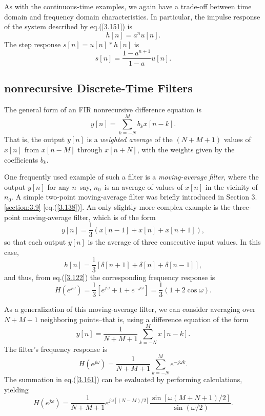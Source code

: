 \documentclass[a4paper,10pt,twoside]{book}
\begin{document}
As with the continuous-time examples, we again have a trade-off between time domain and frequency domain characteristics. In particular, the impulse response of the system described by eq.\;(\ref{3.151}) is
\begin{equation}
    h[n]=a^nu[n].
    \label{3.155}
\end{equation}
The step response $s[n]=u[n]*h[n]$ is
\begin{equation}
    s[n]=\frac{1-a^{n+1}}{1-a}u[n].
    \label{3.156}
\end{equation}

\subsection{nonrecursive Discrete-Time Filters}

The general form of an FIR nonrecursive difference equation is
\begin{equation}
    y[n]=\sum_{k=-N}^Mb_kx[n-k].
    \label{3.157}
\end{equation}
That is, the output $y[n]$ is a \textit{weighted average} of the $(N+M+1)$ values of $x[n]$ from $x[n-M]$ through $x[n+N]$, with the weights given by the coefficients $b_k$.

One frequently used example of such a filter is a \textit{moving-average filter}, where the output $y[n]$ for any $n$--say, $n_0$--is an average of values of $x[n]$ in the vicinity of $n_0$. A simple two-point moving-average filter was briefly introduced in Section 3.\ref{section:3.9} [eq.\;(\ref{3.138})]. An only slightly more complex example is the three-point moving-average filter, which is of the form
\begin{equation}
    y[n]=\frac13(x[n-1]+x[n]+x[n+1]),
    \label{3.158}
\end{equation}
so that each output $y[n]$ is the average of three consecutive input values. In this case, $$h[n]=\frac13[\delta[n+1]+\delta[n]+\delta[n-1]],$$ and thus, from eq.\;(\ref{3.122}) the corresponding frequency response is
\begin{equation}
    H(e^{j\omega})=\frac13[e^{j\omega}+1+e^{-j\omega}]=\frac13(1+2\cos\omega).
    \label{3.159}
\end{equation}

As a generalization of this moving-average filter, we can consider averaging over $N+M+1$ neighboring points--that is, using a difference equation of the form
\begin{equation}
    y[n]=\frac1{N+M+1}\sum_{k=-N}^Mx[n-k].
    \label{3.160}
\end{equation}
The filter's frequency response is
\begin{equation}
    H(e^{j\omega})=\frac1{N+M+1}\sum_{k=-N}^Me^{-j\omega k}.
    \label{3.161}
\end{equation}
The summation in eq.\;(\ref{3.161}) can be evaluated by performing calculations, yielding
\begin{equation}
    H(e^{j\omega})=\frac1{N+M+1}e^{j\omega[(N-M)/2]}\frac{\sin[\omega(M+N+1)/2]}{\sin(\omega/2)}.
    \label{3.162}
\end{equation}
\end{document}
